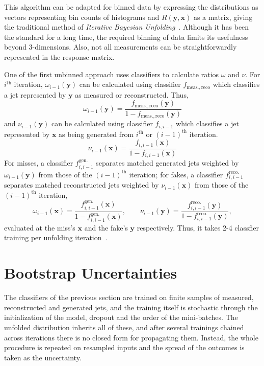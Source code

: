 This algorithm can be adapted for binned data by expressing the distributions as vectors representing bin counts of histograms and \(R(\mathbf{y}, \mathbf{x})\) as a matrix, giving the traditional method of \emph{Iterative Bayesian Unfolding}~\cite{bennerRoounfold}. Although it has been the standard for a long time, the required binning of data limits its usefulness beyond 3-dimensions. Also, not all measurements can be straightforwardly represented in the response matrix. 

One of the first unbinned approach uses classifiers to calculate ratios \(\omega\) and \(\nu\). For \(i^\text{th}\) iteration, \(\omega_{i-1}(\mathbf{y})\) can be calculated using classifier \(f_\mathrm{meas., reco}\) which classifies a jet represented by \(\mathbf{y}\) as measured or reconstructed. Thus, 
\begin{equation}
	\omega_{i-1}(\mathbf{y}) = \frac{f_\mathrm{meas., reco}(\mathbf{y})}{1 - f_\mathrm{meas., reco}(\mathbf{y})}
\end{equation}
and \(\nu_{i-1}(\mathbf{y})\) can be calculated using classifier \(f_{i, i-1}\) which classifies a jet represented by \(\mathbf{x}\) as being generated from \(i^\text{th}\) or \((i-1)^\text{th}\) iteration. 
\begin{equation}
	\nu_{i-1}(\mathbf{x}) = \frac{f_{i, i-1}(\mathbf{x})}{1-f_{i, i-1}(\mathbf{x})}
\end{equation}
 For misses, a classifier \(f^\mathrm{gen.}_{i, i-1}\) separates matched generated jets weighted by \(\omega_{i-1}(\mathbf{y})\) from those of the \((i-1)^\text{th}\) iteration; for fakes, a classifier \(f^\mathrm{reco.}_{i, i-1}\) separates matched reconstructed jets weighted by \(\nu_{i-1}(\mathbf{x})\) from those of the \((i-1)^\text{th}\) iteration,
\begin{equation}
	\omega_{i-1}(\mathbf{x}) = \frac{f^\mathrm{gen.}_{i, i-1}(\mathbf{x})}{1-f^\mathrm{gen.}_{i, i-1}(\mathbf{x})} ,
	\qquad
	\nu_{i-1}(\mathbf{y}) = \frac{f^\mathrm{reco.}_{i, i-1}(\mathbf{y})}{1-f^\mathrm{reco.}_{i, i-1}(\mathbf{y})} ,
\end{equation}
evaluated at the miss's \(\mathbf{x}\) and the fake's \(\mathbf{y}\) respectively. Thus, it takes 2-4 classfier training per unfolding iteration~\cite{andreassen2021scaffoldingsimulationsdeeplearning}.

\section{Bootstrap Uncertainties}
\label{sec:bootstrap}
The classifiers of the previous section are trained on finite samples of measured, reconstructed and generated jets, and the training itself is stochastic through the initialization of the model, dropout and the order of the mini-batches. 
%
The unfolded distribution inherits all of these, and after several trainings chained across iterations there is no closed form for propagating them. 
%
Instead, the whole procedure is repeated on resampled inputs and the spread of the outcomes is taken as the uncertainty. 

